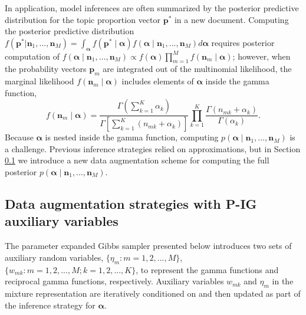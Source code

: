 \documentclass{statsoc}
\newcommand{\p}{\bm{p}}
\newcommand{\alphavec}{\bm{\alpha}}
\newcommand{\nn}{\bm{n}}
\begin{document}
In application, model inferences are often summarized by the posterior predictive distribution for the topic proportion vector $\p^*$ in a new document. Computing the posterior predictive distribution $f\left(\p^*|\nn_1, ..., \nn_M\right) = \int_{\alphavec} f\left(\p^* \mid \alphavec\right) f(\alphavec \mid \nn_1, ..., \nn_M)d\alphavec$ requires posterior computation of $f\left(\alphavec \mid \nn_1, \ldots, \nn_M\right) \propto f\left(\alphavec\right) \prod_{m=1}^M f\left(\nn_m \mid \alphavec\right) $; however, when the probability vectors $\p_m$ are integrated out of the multinomial likelihood, the marginal likelihood $f\left(\nn_m \mid \alphavec\right)$ includes elements of $\alphavec$ inside the gamma function,   
\begin{equation}
f\left(\nn_m \mid \alphavec\right) = \frac{\Gamma\left(\sum_{k=1}^K \alpha_k\right)}{\Gamma\left[\sum_{k=1}^K \left(n_{mk} + \alpha_k\right)\right]} \prod_{k=1}^K \frac{\Gamma\left(n_{mk} + \alpha_k\right)}{\Gamma\left(\alpha_k\right)}.
\end{equation}
Because $\alphavec$ is nested inside the gamma function, computing $p(\alphavec \mid \nn_1, \ldots, \nn_M)$ is a challenge.  Previous inference strategies relied on approximations, but in Section \ref{subsec:Data_Augmentation} we introduce a new data augmentation scheme for computing the full posterior $p\left(\alphavec \mid \nn_1, \ldots, \nn_M\right)$.     

\subsection{Data augmentation strategies with P-IG auxiliary variables}
\label{subsec:Data_Augmentation}
The parameter expanded Gibbs sampler presented below introduces two sets of auxiliary random variables,  $\{\eta_m: m=1,2, ..., M\}$, $\{w_{mk}: m=1,2,...,M; k=1,2,...,K\}$, to represent the gamma functions and reciprocal gamma functions, respectively.  Auxiliary variables $w_{mk}$ and $\eta_m$ in the mixture representation are iteratively conditioned on and then updated as part of the inference strategy for $\alphavec$.    
\end{document}
